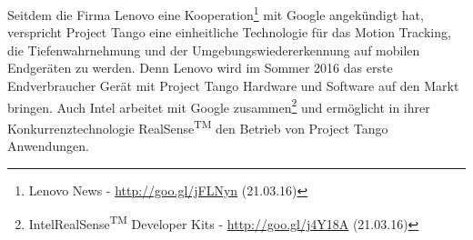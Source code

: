 Seitdem die Firma Lenovo eine Kooperation\footnote{Lenovo News - \url{http://goo.gl/jFLNyn} (21.03.16)} mit Google angekündigt hat, verspricht Project Tango eine einheitliche Technologie für das Motion Tracking, die Tiefenwahrnehmung und der Umgebungswiedererkennung auf mobilen Endgeräten zu werden. Denn Lenovo wird im Sommer 2016 das erste Endverbraucher Gerät mit Project Tango Hardware und Software auf den Markt bringen. Auch Intel arbeitet mit Google zusammen\footnote{Intel\textregistered RealSense\textsuperscript{TM} Developer Kits - \url{http://goo.gl/j4Y18A} (21.03.16)} und ermöglicht in ihrer Konkurrenztechnologie RealSense\textsuperscript{TM} den Betrieb von Project Tango Anwendungen. 
	